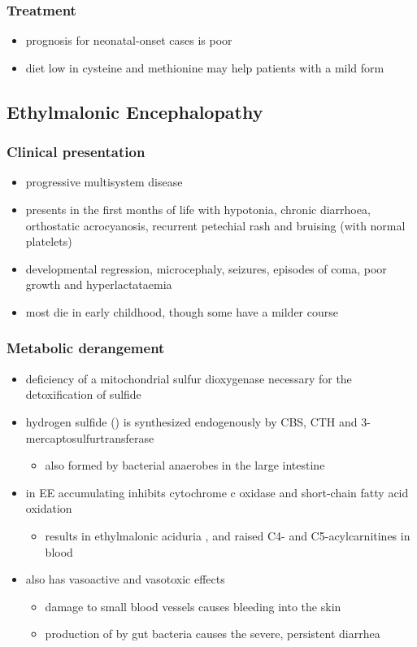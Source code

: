 \documentclass{scrartcl}
\begin{document}
\subsubsection{Treatment}
\label{sec:orge7f0a86}
\begin{itemize}
\item prognosis for neonatal-onset cases is poor
\item diet low in cysteine and methionine may help patients with a mild
form
\end{itemize}

\subsection{Ethylmalonic Encephalopathy}
\label{sec:org87a155f}
\subsubsection{Clinical presentation}
\label{sec:org699f545}
\begin{itemize}
\item progressive multisystem disease
\item presents in the first months of life with hypotonia, chronic
diarrhoea, orthostatic acrocyanosis, recurrent petechial rash and
bruising (with normal platelets)
\item developmental regression, microcephaly, seizures, episodes of coma,
poor growth and hyperlactataemia
\item most die in early childhood, though some have a milder course
\end{itemize}

\subsubsection{Metabolic derangement}
\label{sec:orge0f9285}
\begin{itemize}
\item deficiency of a mitochondrial sulfur dioxygenase necessary for the
detoxification of sulfide
\item hydrogen sulfide () is synthesized endogenously by CBS, CTH
and 3-mercaptosulfurtransferase
\begin{itemize}
\item also formed by bacterial anaerobes in the large intestine
\end{itemize}
\item in EE accumulating  inhibits cytochrome c oxidase and
short-chain fatty acid oxidation
\begin{itemize}
\item results in ethylmalonic aciduria , and raised C4- and C5-acylcarnitines in blood
\end{itemize}
\item {} also has vasoactive and vasotoxic effects
\begin{itemize}
\item damage to small blood vessels causes bleeding into the
skin
\item production of  by gut bacteria causes the severe, persistent diarrhea
\end{itemize}
\end{itemize}
\end{document}
